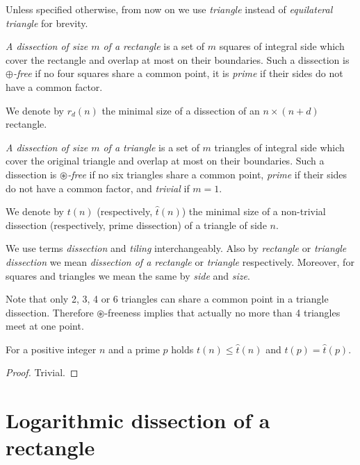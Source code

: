 Unless specified otherwise, from now on we use \emph{triangle} instead of \emph{equilateral triangle} for brevity.

\begin{defn}
\emph{A dissection of size $m$ of a rectangle} is a set of $m$ squares of integral side which cover the rectangle and overlap at most on their boundaries. Such a dissection is \emph{$\oplus$-free} if no four squares share a common point, it is \emph{prime} if their sides do not have a common factor.

We denote by $r_d(n)$ the minimal size of a dissection of an $n \times (n+d)$ rectangle.
\end{defn}

\begin{defn}
\label{defn:triangle-dissection}
\emph{A dissection of size $m$ of a triangle} is a set of $m$ triangles of integral side which cover the original triangle and overlap at most on their boundaries. Such a dissection is \emph{$\circledast$-free} if no six triangles share a common point, \emph{prime} if their sides do not have a common factor, and \emph{trivial} if $m=1$.

We denote by $t(n)$ (respectively, $\hat t(n)$) the minimal size of a non-trivial dissection (respectively, prime dissection) of a triangle of side $n$.
\end{defn}

We use terms \emph{dissection} and \emph{tiling} interchangeably. Also by \emph{rectangle} or \emph{triangle dissection} we mean \emph{dissection of a rectangle} or \emph{triangle} respectively. Moreover, for squares and triangles we mean the same by \emph{side} and \emph{size}.

Note that only 2, 3, 4 or 6 triangles can share a common point in a triangle dissection. Therefore $\circledast$-freeness implies that actually no more than 4 triangles meet at one point.

\begin{lem}
For a positive integer $n$ and a prime $p$ holds $t(n) \leq \hat t(n)$ and $t(p) = \hat t(p)$.
\end{lem}
\begin{proof}
Trivial.
\end{proof}

\section{Logarithmic dissection of a rectangle}
\label{sec:log-rectangle}

